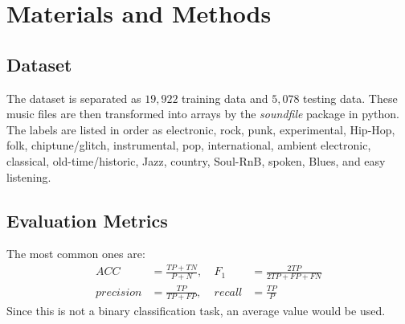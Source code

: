 \documentclass[sigconf ,nonacm]{acmart}
\begin{document}
\section{Materials and Methods}
\subsection{Dataset}
The dataset is separated as $19,922$ training data and $5,078$ testing data. These music files are then transformed into arrays by the {\it soundfile} package in python. The labels are listed in order as electronic, rock, punk, experimental, Hip-Hop, folk, chiptune/glitch, instrumental, pop, international, ambient electronic, classical, old-time/historic, Jazz, country, Soul-RnB, spoken, Blues, and easy listening.
\subsection{Evaluation Metrics}
The most common ones are:
\begin{align*}
ACC &= \frac{TP+TN}{P+N},\ &F_1 &= \frac{2TP}{2TP+FP+FN}\\
precision &= \frac{TP}{TP+FP},\ &recall &= \frac{TP}{P}
\end{align*}
Since this is not a binary classification task, an average value would be used.






\end{document}
